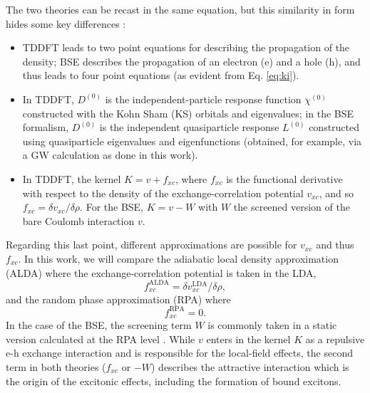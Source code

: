 \documentclass[aps,prb,10pt,showpacs,superscriptaddress,twocolumn,notitlepage]{revtex4-1}
\begin{document}
The two theories can be recast in the same equation, but this similarity in form
hides some key differences \cite{luciabook, sottilePRL03}:
\begin{itemize}
\item TDDFT leads to two point equations for describing the propagation of the
density; BSE describes the propagation of an electron (e) and a hole (h), and
thus leads to four point equations (as evident from  Eq. \ref{eq:ki}).
\item In TDDFT, $D^{(0)}$ is the independent-particle response function
$\chi^{(0)}$ constructed with the Kohn Sham (KS) orbitals and eigenvalues; in
the BSE formalism, $D^{(0)}$ is the independent quasiparticle response $L^{(0)}$
constructed using quasiparticle eigenvalues and eigenfunctions (obtained, for
example, via a GW calculation as done in this work).
\item In TDDFT, the kernel $K = v + f_{xc}$, where $f_{xc}$ is the functional
derivative with respect to the density of the exchange-correlation potential
$v_{xc}$, and so $f_{xc} = \delta v_{xc}/\delta\rho$. For the BSE, $K = v - W$
with $W$ the screened version of the bare Coulomb interaction $v$.
\end{itemize}
Regarding this last point, different approximations are possible for $v_{xc}$
and thus $f_{xc}$. In this work, we will compare the adiabatic local density
approximation (ALDA) where the exchange-correlation potential is taken in the
LDA,
\begin{equation}
f^{\mathrm{ALDA}}_{xc} = \delta v^{\mathrm{LDA}}_{xc}/\delta\rho,
\end{equation} 
and the random phase approximation (RPA) where
\begin{equation}
f^{\mathrm{RPA}}_{xc} = 0.
\end{equation}
In the case of the BSE, the screening term $W$ is commonly taken in a static
version calculated at the RPA level \cite{onidaRMP02, luciabook}. While $v$
enters in the kernel $K$ as a repulsive e-h exchange interaction and is
responsible for the local-field effects, the second term in both theories
($f_{xc}$ or $-W$) describes the attractive interaction which is the origin of
the excitonic effects, including the formation of bound excitons.
 
\end{document}
